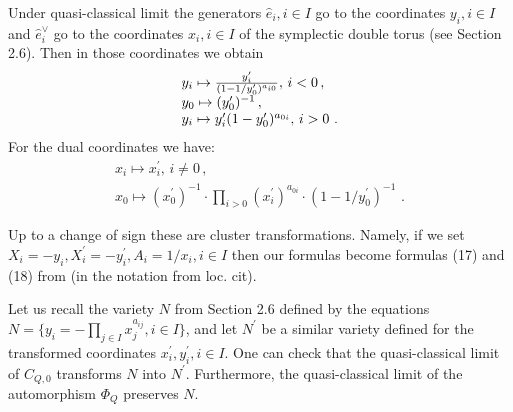 \documentclass[12pt]{article}
\begin{document}
Under quasi-classical limit the generators $\hat{e}_i, i\in I$ go to the coordinates $y_i, i\in I$ and $\hat{e}_i^{\vee}$
go to the coordinates $x_i, i\in I$ of the symplectic double torus (see Section 2.6).
Then in those coordinates we obtain
$$\begin{array}{l}y_i\mapsto {y_i^{\prime}\over{(1-1/y_0^{\prime})^{a_{i0}}}},\,i<0\,,\\
y_0\mapsto (y_0^{\prime})^{-1}\,,\\
y_i\mapsto y_i^{\prime}(1-y_0^{\prime})^{a_{0i}},\, i>0\,\,.
\end{array}$$
For the dual coordinates we have:
$$\begin{array}{l}x_i\mapsto x_i^{\prime}, \,i\ne 0\,,\\
x_0\mapsto (x_0^{\prime})^{-1}\cdot \prod_{i>0}(x_i^{\prime})^{a_{0i}}\cdot (1-1/y_0^{\prime})^{-1}
\,\,.\end{array}$$

Up to a change of sign these are cluster transformations. Namely, if we set
$X_i=-y_i, X_i^{\prime}=-y_i^{\prime}, A_i=1/x_i, i\in I$ then our formulas become formulas (17) and (18) from \cite{FG}
(in the notation from loc. cit).

\begin{rmk} Let us recall the variety $N$ from Section 2.6 defined by the equations
$N=\{y_i=-\prod_{j\in I}x_j^{a_{ij}}, i\in I\}$,
and let $N^{\prime}$ be a similar variety defined for the transformed coordinates $x_i^{\prime}, y_i^{\prime}, i\in I$. One can check that the quasi-classical limit of $C_{Q,0}$ transforms $N$ into $N^{\prime}$. Furthermore, the quasi-classical limit of the automorphism $\Phi_Q$ preserves $N$.

\end{rmk}
\end{document}

